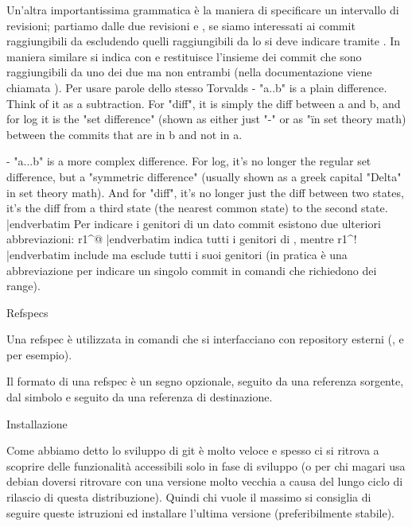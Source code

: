 Un'altra importantissima grammatica \`e la maniera di specificare un intervallo
di revisioni; partiamo dalle due revisioni  e , se siamo
interessati ai commit raggiungibili da  escludendo quelli
raggiungibili da  lo si deve indicare tramite . In maniera
similare si indica con  e restituisce l'insieme dei commit che
sono raggiungibili da uno dei due ma non entrambi (nella documentazione viene
chiamata ).
Per usare parole dello stesso Torvalds
\smallskip
\noindent{}
\smallskip
\verbatim
 - "a..b" is a plain difference. Think of it as a subtraction. For "diff", 
   it is simply the diff between a and b, and for log it is the "set 
   difference" (shown as either just "-" or as "\" in set theory math) 
   between the commits that are in b and not in a.

 - "a...b" is a more complex difference. For log, it's no longer the 
   regular set difference, but a "symmetric difference" (usually shown as 
   a greek capital "Delta" in set theory math). And for "diff", it's no 
   longer just the diff between two states, it's the diff from a third 
   state (the nearest common state) to the second state.
|endverbatim
\smallskip
Per indicare i genitori di un dato commit esistono due ulteriori abbreviazioni:
\verbatim r1^@ |endverbatim indica tutti i genitori di , mentre
\verbatim r1^! |endverbatim include
 ma esclude tutti i suoi genitori (in pratica \`e una abbreviazione per
indicare un singolo commit in comandi che richiedono dei range). 



\sezione Refspecs

Una refspec \`e utilizzata in comandi che si interfacciano con repository
esterni (,  e  per esempio).

Il formato di una refspec \`e un segno \code{+} opzionale, seguito da una
referenza sorgente, dal simbolo \code{:} e seguito da una referenza di
destinazione.

\sezione Installazione

Come abbiamo detto lo sviluppo di git \`e molto veloce e spesso ci si ritrova a
scoprire delle funzionalit\`a accessibili solo in fase di sviluppo
(o per chi magari
usa debian doversi ritrovare con una versione molto vecchia a causa del lungo
ciclo di rilascio di questa distribuzione). Quindi chi vuole il massimo si
consiglia di seguire queste istruzioni ed installare l'ultima versione
(preferibilmente stabile).

